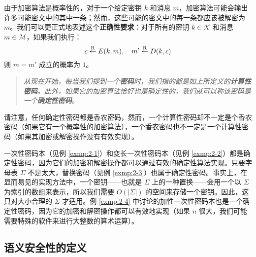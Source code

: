 由于加密算法是概率性的，对于一个给定密钥 $k$ 和消息 $m$，加密算法可能会输出许多可能密文中的其中一条；然而，这些可能的密文中的每一条都应该被解密为 $m$。我们可以更正式地表述这个\textbf{正确性要求}：对于所有的密钥 $k\in\mathcal{K}$ 和消息 $m\in\mathcal{M}$，如果我们执行：
\[
c\overset{\rm R}\leftarrow E(k,m),
\quad
m'\overset{\rm R}\leftarrow D(k,c)
\]
则 $m=m'$ 成立的概率为 $1$。

\begin{quote}
\begin{tcolorbox}[colframe=black,colback=white,boxrule=0.6pt,arc=0pt]
\emph{从现在开始，每当我们提到一个\textbf{密码}时，我们指的都是如上所定义的\textbf{计算性密码}。此外，如果它的加密算法恰好也是确定性的，我们就可以称该密码是一个\textbf{确定性密码}。}
\end{tcolorbox}
\end{quote}

请注意，任何确定性密码都是香农密码，然而，一个计算性密码却不一定是个香农密码（如果它有一个概率性的加密算法），一个香农密码也不一定是一个计算性密码（如果其加密或解密操作没有有效实现）。

\begin{example}
一次性密码本（见例 \ref{exmp:2-1}）和变长一次性密码本（见例 \ref{exmp:2-2}）都是确定性密码，因为它们的加密和解密操作都可以通过有效的确定性算法实现。只要字母表 $\Sigma$ 不是太大，替换密码（见例 \ref{exmp:2-3}）也属于确定性密码。事实上，在显而易见的实现方法中，一个密钥——也就是 $\Sigma$ 上的一种置换——会用一个以 $\Sigma$ 为索引的数组来表示，所以我们需要 $O(|\Sigma|)$ 的空间来存储一个密钥。因此，这只对大小合理的 $\Sigma$ 才适用。例 \ref{exmp:2-4} 中讨论的加性一次性密码本也是一个确定性密码，因为它的加密和解密操作都可以有效地实现（如果 $n$ 很大，我们可能需要特殊的软件来进行大整数的算术运算）。
\end{example}

\subsection{语义安全性的定义}\label{subsec:2-2-2}

